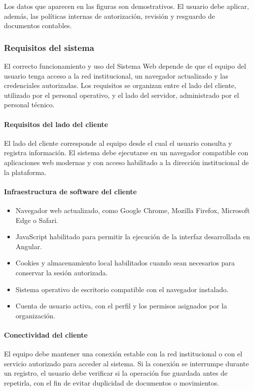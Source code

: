Los datos que aparecen en las figuras son demostrativos. El usuario debe aplicar, además, las políticas internas de autorización, revisión y resguardo de documentos contables.

\subsubsection{Requisitos del sistema}
El correcto funcionamiento y uso del Sistema Web depende de que el equipo del usuario tenga acceso a la red institucional, un navegador actualizado y las credenciales autorizadas. Los requisitos se organizan entre el lado del cliente, utilizado por el personal operativo, y el lado del servidor, administrado por el personal técnico.

\paragraph{Requisitos del lado del cliente}
El lado del cliente corresponde al equipo desde el cual el usuario consulta y registra información. El sistema debe ejecutarse en un navegador compatible con aplicaciones web modernas y con acceso habilitado a la dirección institucional de la plataforma.

\paragraph{Infraestructura de software del cliente}
\begin{itemize}
\item Navegador web actualizado, como Google Chrome, Mozilla Firefox, Microsoft Edge o Safari.
\item JavaScript habilitado para permitir la ejecución de la interfaz desarrollada en Angular.
\item Cookies y almacenamiento local habilitados cuando sean necesarios para conservar la sesión autorizada.
\item Sistema operativo de escritorio compatible con el navegador instalado.
\item Cuenta de usuario activa, con el perfil y los permisos asignados por la organización.
\end{itemize}

\paragraph{Conectividad del cliente}
El equipo debe mantener una conexión estable con la red institucional o con el servicio autorizado para acceder al sistema. Si la conexión se interrumpe durante un registro, el usuario debe verificar si la operación fue guardada antes de repetirla, con el fin de evitar duplicidad de documentos o movimientos.

